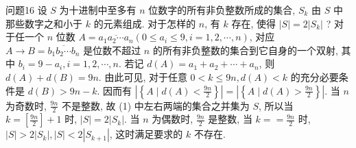 问题16 设 $S$ 为十进制中至多有 $n$ 位数字的所有非负整数所成的集合, $S_k$ 由 $S$ 中那些数字之和小于 $k$ 的元素组成.
对于怎样的 $n$, 有 $k$ 存在, 使得 $|S|= 2\left|S_k\right|$ ?
对于任一个 $n$ 位数 $A=\overline{a_1 a_2 \cdots a_n}\left(0 \leqslant a_i \leqslant 9, i=1,2, \cdots, n\right)$, 对应 $A \rightarrow B=\overline{b_1 b_2 \cdots b_n}$ 是位数不超过 $n$ 的所有非负整数的集合到它自身的一个双射, 其中 $b_i=9-a_i, i=1,2, \cdots, n$. 若记 $d(A)=a_1+a_2+\cdots+a_n$, 则 $d(A)+d(B)=9 n$. 由此可见, 对于任意 $0<k \leqslant 9 n, d(A)<k$ 的充分必要条件是 $d(B)>9 n-k$. 因而有 $\left|\left\{A \mid d(A)<\frac{9 n}{2}\right\}\right|=\left|\left\{A \mid d(A)>\frac{9 n}{2}\right\}\right|$.
当 $n$ 为奇数时, $\frac{9 n}{2}$ 不是整数, 故 (1) 中左右两端的集合之并集为 $S$, 所以当 $k=\left[\frac{9 n}{2}\right]+1$ 时, $|S|=2\left|S_k\right|$. 当 $n$ 为偶数时, $\frac{9 n}{2}$ 是整数, 当 $k==\frac{9 n}{2}$ 时, $|S|> 2\left|S_k\right|,|S|<2\left|S_{k+1}\right|$, 这时满足要求的 $k$ 不存在.



